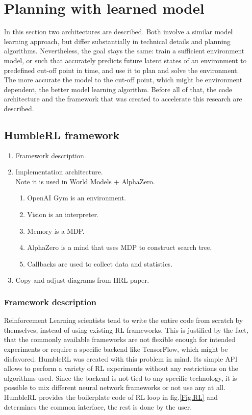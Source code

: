 \section{Planning with learned model}

In this section two architectures are described. Both involve a similar model learning approach, but differ substantially in technical details and planning algorithms. Nevertheless, the goal stays the same: train a sufficient environment model, or such that accurately predicts future latent states of an environment to predefined cut-off point in time, and use it to plan and solve the environment. The more accurate the model to the cut-off point, which might be environment dependent, the better model learning algorithm.
Before all of that, the code architecture and the framework that was created to accelerate this research are described.


\subsection{HumbleRL framework}

\begin{enumerate}
\item Framework description.
\item Implementation architecture.\\ Note it is used in World Models + AlphaZero.
  \begin{enumerate}
  \item OpenAI Gym is an environment.
  \item Vision is an interpreter.
  \item Memory is a MDP.
  \item AlphaZero is a mind that uses MDP to construct search tree.
  \item Callbacks are used to collect data and statistics.
  \end{enumerate}
\item Copy and adjust diagrams from HRL paper.
\end{enumerate}

\subsubsection{Framework description}
Reinforcement Learning scientists tend to write the entire code from scratch by themselves, instead of using existing RL frameworks. This is justified by the fact, that the commonly available frameworks are not flexible enough for intended experiments or require a specific backend like TensorFlow, which might be disfavored.
HumbleRL \cite{Code.HRL} was created with this problem in mind. Its simple API allows to perform a variety of RL experiments without any restrictions on the algorithms used. Since the backend is not tied to any specific technology, it is possible to mix different neural network frameworks or not use any at all. HumbleRL provides the boilerplate code of RL loop in fig.\ref{Fig.RL} and determines the common interface, the rest is done by the user.

